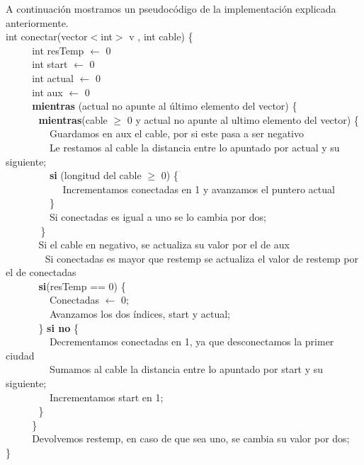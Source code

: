 A continuación mostramos un pseudocódigo de la implementación explicada anteriormente. \\

int conectar(vector$<$int$>$ v , int cable) \{ \\
$~~~~~~~~~~~~$int resTemp $\leftarrow$ 0 \\
$~~~~~~~~~~~~$int start $\leftarrow$ 0 \\
$~~~~~~~~~~~~$int actual $\leftarrow$ 0 \\
$~~~~~~~~~~~~$int aux $\leftarrow$ 0 \\
$~~~~~~~~~~~~$\textbf{mientras} (actual no apunte al último elemento del vector) \{    \\
$~~~~~~~~~~~~~~~$\textbf{mientras}(cable $\geq$ 0 y actual no apunte al ultimo elemento del vector) \{   \\
$~~~~~~~~~~~~~~~~~~~~$Guardamos en aux el cable, por si este pasa a ser negativo \\
$~~~~~~~~~~~~~~~~~~~~$Le restamos al cable la distancia entre lo apuntado por actual y su siguiente; \\
$~~~~~~~~~~~~~~~~~~~~$\textbf{si} (longitud del cable $\geq$ 0) \{  \\
$~~~~~~~~~~~~~~~~~~~~~~~~~~$Incrementamos conectadas en 1 y avanzamos el puntero actual 
$~~~~~~~~~~~~~~~~~~~~$\} \\
$~~~~~~~~~~~~~~~~~~~~$Si conectadas es igual a uno se lo cambia por dos;  \\
$~~~~~~~~~~~~~~~~$\}\\
$~~~~~~~~~~~~~~~$Si el cable en negativo, se actualiza su valor por el de aux\\
$~~~~~~~~~~~~~~~~~~$Si conectadas es mayor que restemp se actualiza el valor de restemp por el de conectadas\\
$~~~~~~~~~~~~~~~$\textbf{si}(resTemp == 0) \{   \\
$~~~~~~~~~~~~~~~~~~~~$Conectadas  $\leftarrow$ 0; \\
$~~~~~~~~~~~~~~~~~~~~$Avanzamos los dos índices, start y actual;  \\
$~~~~~~~~~~~~~~~$\} \textbf{si no} \{ \\
$~~~~~~~~~~~~~~~~~~~~$Decrementamos conectadas en 1, ya que desconectamos la primer ciudad \\
$~~~~~~~~~~~~~~~~~~~~$Sumamos al cable la distancia entre lo apuntado por start y su siguiente;\\
$~~~~~~~~~~~~~~~~~~~~$Incrementamos start en 1;  \\
$~~~~~~~~~~~~~~~$\} \\
$~~~~~~~~~~~~$\} \\
$~~~~~~~~~~~~$Devolvemos restemp, en caso de que sea uno, se cambia su valor por dos;  \\
\}\\


